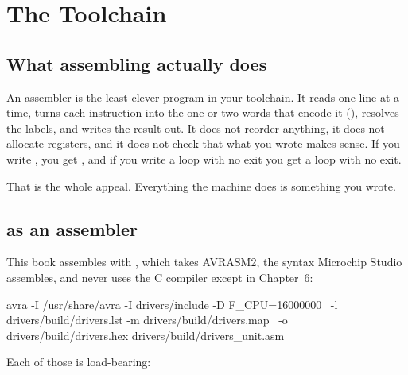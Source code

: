
\section{The Toolchain}
\label{c1:sec:toolchain}

\subsection{What assembling actually does}
\label{c1:sec:assembling}
An assembler is the least clever program in your toolchain. It reads one line at a time, turns
each instruction into the one or two words that encode it (), resolves the
labels, and writes the result out. It does not reorder anything, it does not allocate registers,
and it does not check that what you wrote makes sense. If you write , you get
, and if you write a loop with no exit you get a loop with no exit.

That is the whole appeal. Everything the machine does is something you wrote.


\subsection{ as an assembler}
\label{c1:sec:avra}
This book assembles with , which takes AVRASM2, the syntax Microchip Studio assembles,
and never uses the C compiler except in Chapter~6:

\begin{shell}
avra -I /usr/share/avra -I drivers/include -D F_CPU=16000000 \
     -l drivers/build/drivers.lst -m drivers/build/drivers.map \
     -o drivers/build/drivers.hex drivers/build/drivers_unit.asm
\end{shell}

Each of those is load-bearing:

